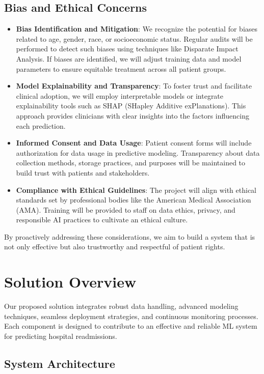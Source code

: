 \documentclass{article}
\begin{document}
\subsection{Bias and Ethical Concerns}

\begin{itemize}[leftmargin=*]
    \item \textbf{Bias Identification and Mitigation}: We recognize the potential for biases related to age, gender, race, or socioeconomic status. Regular audits will be performed to detect such biases using techniques like Disparate Impact Analysis. If biases are identified, we will adjust training data and model parameters to ensure equitable treatment across all patient groups.
    \item \textbf{Model Explainability and Transparency}: To foster trust and facilitate clinical adoption, we will employ interpretable models or integrate explainability tools such as SHAP (SHapley Additive exPlanations). This approach provides clinicians with clear insights into the factors influencing each prediction.
    \item \textbf{Informed Consent and Data Usage}: Patient consent forms will include authorization for data usage in predictive modeling. Transparency about data collection methods, storage practices, and purposes will be maintained to build trust with patients and stakeholders.
    \item \textbf{Compliance with Ethical Guidelines}: The project will align with ethical standards set by professional bodies like the American Medical Association (AMA). Training will be provided to staff on data ethics, privacy, and responsible AI practices to cultivate an ethical culture.
\end{itemize}

By proactively addressing these considerations, we aim to build a system that is not only effective but also trustworthy and respectful of patient rights.

\section{Solution Overview}

Our proposed solution integrates robust data handling, advanced modeling techniques, seamless deployment strategies, and continuous monitoring processes. Each component is designed to contribute to an effective and reliable ML system for predicting hospital readmissions.

\subsection{System Architecture}
\end{document}
